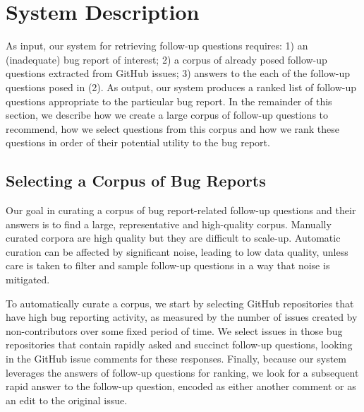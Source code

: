 \section{System Description}

As input, our system for retrieving follow-up questions requires: 1) an (inadequate) bug
report of interest; 2) a corpus of already posed follow-up questions extracted
from GitHub issues; 3) answers to the each of the follow-up questions posed in (2). As output, our system
produces a ranked list of follow-up questions appropriate to the particular bug report.
In the remainder of this section, we describe how we create a large corpus of follow-up questions
to recommend, how we select questions from this corpus and how we rank these questions in order
of their potential utility to the bug report.

\subsection{Selecting a Corpus of Bug Reports}

Our goal in curating a corpus of bug report-related follow-up questions and their answers
is to find a large, representative and high-quality corpus. Manually curated corpora are
high quality but they are difficult to scale-up. Automatic curation can be affected by
significant noise, leading to low data quality, unless care is taken
to filter and sample follow-up questions in a way that noise is mitigated.

To automatically curate a corpus, we start by selecting GitHub repositories that have high bug reporting activity,
as measured by the number of issues created by non-contributors over some fixed period of time.
We select issues in those bug repositories that contain rapidly asked and succinct follow-up
questions, looking in the GitHub issue comments for these responses. Finally, because our system leverages
the answers of follow-up questions for ranking, we look for
a subsequent rapid answer to the follow-up question, encoded as either another comment or as an edit to the
original issue.

